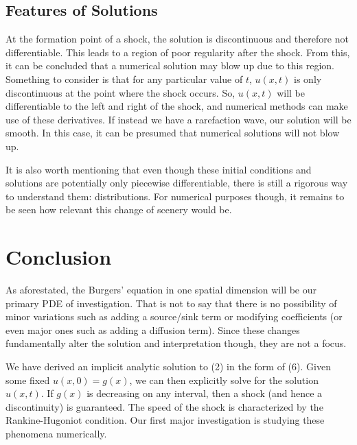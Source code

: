 \documentclass{myproject}
\begin{document}
\subsection{Features of Solutions}
At the formation point of a shock, the solution is discontinuous and therefore not differentiable. This leads to a region of poor regularity after the shock. From this, it can be concluded that a numerical solution may blow up due to this region. Something to consider is that for any particular value of $t$, $u(x, t)$ is only discontinuous at the point where the shock occurs. So, $u(x,t)$ will be differentiable to the left and right of the shock, and numerical methods can make use of these derivatives. If instead we have a rarefaction wave, our solution will be smooth. In this case, it can be presumed that numerical solutions will not blow up.

It is also worth mentioning that even though these initial conditions and solutions are potentially only piecewise differentiable, there is still a rigorous way to understand them: distributions. For numerical purposes though, it remains to be seen how relevant this change of scenery would be.

\section{Conclusion}

As aforestated, the Burgers' equation in one spatial dimension will be our primary PDE of investigation. That is not to say that there is no possibility of minor variations such as adding a source/sink term or modifying coefficients (or even major ones such as adding a diffusion term). Since these changes fundamentally alter the solution and interpretation though, they are not a focus. 

We have derived an implicit analytic solution to (2) in the form of (6). Given some fixed $u(x,0) = g(x)$, we can then explicitly solve for the solution $u(x,t)$. If $g(x)$ is decreasing on any interval, then a shock (and hence a discontinuity) is guaranteed. The speed of the shock is characterized by the Rankine-Hugoniot condition. Our first major investigation is studying these phenomena numerically.

\nocite{choksi2022}
\nocite{iserles2009}
\nocite{kutz2013}
\nocite{trefethen2001}
\nocite{learncfd}
\nocite{evans2010}
\printbibliography
\end{document}
